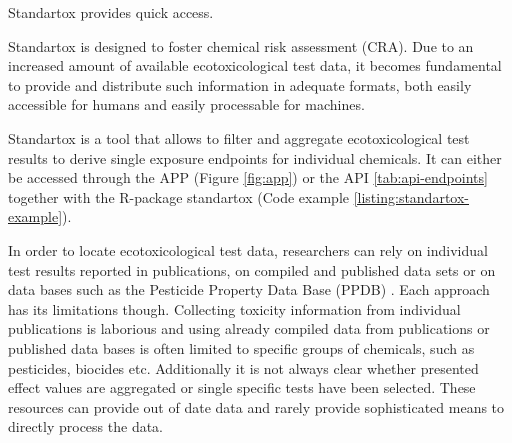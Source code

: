 
Standartox provides quick access.

Standartox is designed to foster chemical risk assessment (CRA). Due to an increased amount of available ecotoxicological test data, it becomes fundamental to provide and distribute such information in adequate formats, both easily accessible for humans and easily processable for machines. 







Standartox is a tool that allows to filter and aggregate ecotoxicological test results to derive single exposure endpoints for individual chemicals. It can either be accessed through the APP (Figure \ref{fig:app}) or the API \ref{tab:api-endpoints} together with the R-package standartox (Code example \ref{listing:standartox-example}). 











\pagebreak


\pagebreak


\pagebreak




In order to locate ecotoxicological test data, researchers can rely on individual test results reported in publications, on compiled and published data sets \citep{malaj_organic_2014, morrissey_neonicotinoid_2015} or on data bases such as the Pesticide Property Data Base (PPDB) \citep{lewis_international_2016}. Each approach has its limitations though. Collecting toxicity information from individual publications is laborious and using already compiled data from publications or published data bases is often limited to specific groups of chemicals, such as pesticides, biocides etc. Additionally it is not always clear whether presented effect values are aggregated or single specific tests have been selected. These resources can provide out of date data and rarely provide sophisticated means to directly process the data.



